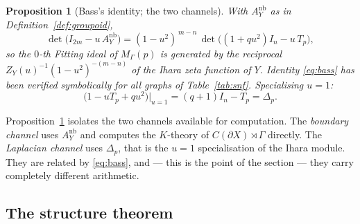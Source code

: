 \documentclass[11pt]{amsart}
\numberwithin{equation}{section}
\newtheorem{proposition}[theorem]{Proposition}
\theoremstyle{definition}
\theoremstyle{remark}
\begin{document}
\begin{proposition}[Bass's identity; the two channels]\label{prop:bass}
With $A^{\mathrm{nb}}_Y$ as in Definition~\ref{def:groupoid},
\begin{equation}\label{eq:bass}
\det\bigl(I_{2m}-u\,A^{\mathrm{nb}}_Y\bigr)
=(1-u^2)^{\,m-n}\,\det\bigl((1+qu^2)I_n-u\,T_p\bigr),
\end{equation}
so the $0$-th Fitting ideal of $M_\Gamma(p)$ is generated by the reciprocal
$Z_Y(u)^{-1}(1-u^2)^{-(m-n)}$ of the Ihara zeta function of $Y$. Identity
\eqref{eq:bass} has been verified symbolically for all graphs of
Table~\ref{tab:snf}. Specialising $u=1$:
\[
\bigl(1-uT_p+qu^2\bigr)\big|_{u=1}=(q+1)I_n-T_p=\Delta_p .
\]
\end{proposition}

Proposition~\ref{prop:bass} isolates the two channels available for computation. The
\emph{boundary channel} uses $A^{\mathrm{nb}}_Y$ and computes the $K$-theory of
$C(\partial X)\rtimes\Gamma$ directly. The \emph{Laplacian channel} uses $\Delta_p$, that
is the $u=1$ specialisation of the Ihara module. They are related by \eqref{eq:bass},
and --- this is the point of the section --- they carry completely different arithmetic.

\subsection{The structure theorem}
\end{document}
